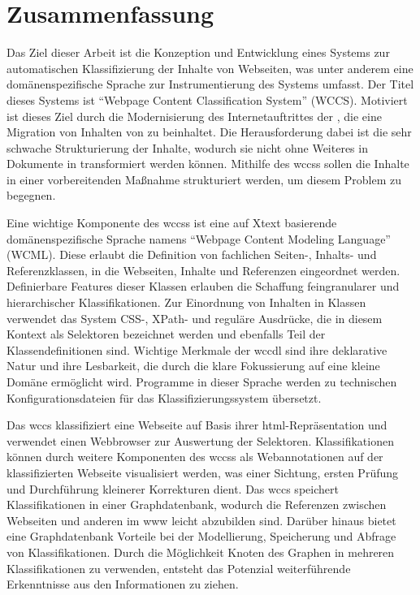 \section{Zusammenfassung}
    Das Ziel dieser Arbeit ist die Konzeption und Entwicklung
    eines Systems zur automatischen Klassifizierung der Inhalte
    von Webseiten, was unter anderem eine domänenspezifische
    Sprache zur Instrumentierung des Systems umfasst.
    Der Titel dieses Systems ist
    "`Webpage Content Classification System"' (WCCS).
    Motiviert ist dieses Ziel durch die Modernisierung des
    Internetauftrittes der {\fernUni},
    die eine Migration von Inhalten von {\wordpress} zu
    {\imperia} beinhaltet.
    Die Herausforderung dabei ist die sehr schwache Strukturierung
    der Inhalte, wodurch sie nicht ohne Weiteres in
    Dokumente in {\imperia} transformiert werden können.
    Mithilfe des \glspl{wccs} sollen die Inhalte in einer vorbereitenden
    Maßnahme strukturiert werden, um diesem Problem zu begegnen.

    Eine wichtige Komponente des \glspl{wccs} ist eine auf Xtext basierende
    domänenspezifische Sprache namens "`Webpage Content Modeling Language"' (WCML).
    Diese erlaubt die Definition von fachlichen Seiten-, Inhalts- und
    Referenzklassen, in die Webseiten, Inhalte und Referenzen eingeordnet werden.
    Definierbare Features dieser Klassen erlauben die Schaffung feingranularer
    und hierarchischer Klassifikationen.
    Zur Einordnung von Inhalten in Klassen verwendet das System
    CSS-, XPath- und reguläre Ausdrücke, die in diesem Kontext als
    Selektoren bezeichnet werden und
    ebenfalls Teil der Klassendefinitionen sind.
    Wichtige Merkmale der \gls{wccdl} sind ihre deklarative Natur
    und ihre Lesbarkeit,
    die durch die klare Fokussierung auf eine kleine Domäne ermöglicht wird.
    Programme in dieser Sprache werden zu technischen
    Konfigurationsdateien für das Klassifizierungssystem übersetzt.

    Das \gls{wccs} klassifiziert eine Webseite auf Basis ihrer
    \gls{html}-Repräsentation und verwendet einen Webbrowser zur Auswertung der Selektoren.
    Klassifikationen können durch weitere Komponenten des \glspl{wccs}
    als Webannotationen auf der klassifizierten Webseite visualisiert werden,
    was einer Sichtung, ersten Prüfung und Durchführung kleinerer
    Korrekturen dient.
    Das \gls{wccs} speichert Klassifikationen in einer Graphdatenbank,
    wodurch die Referenzen zwischen Webseiten und anderen {\resources}
    im \gls{www} leicht abzubilden sind.
    Darüber hinaus bietet eine Graphdatenbank Vorteile bei der Modellierung,
    Speicherung und Abfrage von Klassifikationen.
    Durch die Möglichkeit Knoten des Graphen in mehreren Klassifikationen
    zu verwenden, entsteht das Potenzial weiterführende Erkenntnisse
    aus den Informationen zu ziehen.

